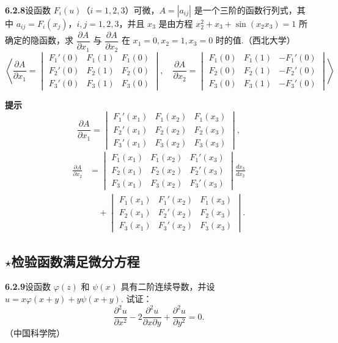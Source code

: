 \documentclass[UTF8,12pt,a4paper,fontset=fandol]{ctexart}
\begin{document}
\noindent\textbf{6.2.8}\quad 设函数 $F_i(u)$（$i=1,2,3$）可微，$A=|a_{ij}|$ 是一个三阶的函数行列式，其中 $a_{ij}=F_i(x_j)$，$i,j=1,2,3$，并且 $x_3$ 是由方程 $x_2^2+x_3+\sin(x_2x_3)=1$ 所确定的隐函数，求 $\dfrac{\partial A}{\partial x_1}$ 与 $\dfrac{\partial A}{\partial x_2}$ 在 $x_1=0,x_2=1,x_3=0$ 时的值.（西北大学）
\[
  \left\langle
  \frac{\partial A}{\partial x_1}=
  \begin{vmatrix}
  F_1'(0)&F_1(1)&F_1(0)\\
  F_2'(0)&F_2(1)&F_2(0)\\
  F_3'(0)&F_3(1)&F_3(0)
  \end{vmatrix},\quad
  \frac{\partial A}{\partial x_2}=
  \begin{vmatrix}
  F_1(0)&F_1(1)&-F_1'(0)\\
  F_2(0)&F_2(1)&-F_2'(0)\\
  F_3(0)&F_3(1)&-F_3'(0)
  \end{vmatrix}
  \right\rangle
\]

\noindent\textbf{提示}\quad
\[
  \frac{\partial A}{\partial x_1}=
  \begin{vmatrix}
  F_1'(x_1)&F_1(x_2)&F_1(x_3)\\
  F_2'(x_1)&F_2(x_2)&F_2(x_3)\\
  F_3'(x_1)&F_3(x_2)&F_3(x_3)
  \end{vmatrix},
\]
\[
\begin{aligned}
\frac{\partial A}{\partial x_2}
&=
  \begin{vmatrix}
  F_1(x_1)&F_1(x_2)&F_1'(x_3)\\
  F_2(x_1)&F_2(x_2)&F_2'(x_3)\\
  F_3(x_1)&F_3(x_2)&F_3'(x_3)
  \end{vmatrix}\frac{dx_3}{dx_2}\\
&\quad+
  \begin{vmatrix}
  F_1(x_1)&F_1'(x_2)&F_1(x_3)\\
  F_2(x_1)&F_2'(x_2)&F_2(x_3)\\
  F_3(x_1)&F_3'(x_2)&F_3(x_3)
  \end{vmatrix}.
\end{aligned}
\]

\subsection*{\ensuremath{\star}检验函数满足微分方程}

\noindent\textbf{6.2.9}\quad 设函数 $\varphi(z)$ 和 $\psi(x)$ 具有二阶连续导数，并设 $u=x\varphi(x+y)+y\psi(x+y)$. 试证：
\[
  \frac{\partial^2u}{\partial x^2}-2\frac{\partial^2u}{\partial x\partial y}
  +\frac{\partial^2u}{\partial y^2}=0.
\]
（中国科学院）
\end{document}
